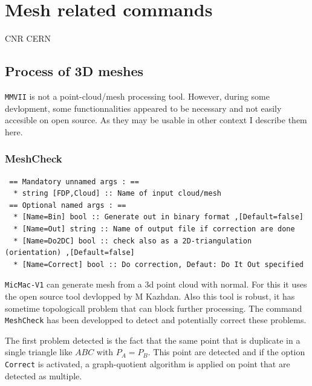 \chapter{Mesh related commands}


CNR  CERN 



\section{Process of 3D meshes}

 {\tt MMVII} is not a point-cloud/mesh processing tool. However, during some devlopment, some
functionnalities appeared to be necessary and not easily accesible on open source.
As they may be usable in other context I describe them here.

\subsection{MeshCheck}

\begin{verbatim}
 == Mandatory unnamed args : ==
  * string [FDP,Cloud] :: Name of input cloud/mesh
 == Optional named args : ==
  * [Name=Bin] bool :: Generate out in binary format ,[Default=false]
  * [Name=Out] string :: Name of output file if correction are done
  * [Name=Do2DC] bool :: check also as a 2D-triangulation (orientation) ,[Default=false]
  * [Name=Correct] bool :: Do correction, Defaut: Do It Out specified
\end{verbatim}

{\tt MicMac-V1} can generate mesh from a 3d point cloud with normal. For this it
uses the open source tool devlopped by M Kazhdan. Also this tool is robust,
it has sometime topologicall problem that can block further processing.
The command {\tt MeshCheck} has been developped to  detect and potentially
correct these problems.

The first problem detected   is the fact that the same point that is duplicate in
a single triangle  like $ABC$  with $P_A=P_B$. This point are detected and
if the option {\tt Correct} is activated, a graph-quotient algorithm is applied 
on point that are detected as multiple.


